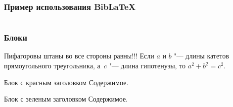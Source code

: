 \documentclass[aspectratio=169]{beamer}
\begin{document}
\begin{frame}
\frametitle{Пример использования BibLaTeX}
\medskip
\begin{columns}
\end{columns}
\end{frame}

\begin{frame}
\frametitle{Блоки}
	\begin{theorem}[Пифагора]
		Пифагоровы штаны во все стороны равны!!!
		Если $a$ и $b$ "--- длины катетов прямоугольного треугольника, а~$c$ "--- длина гипотенузы, то $a^2+b^2=c^2$.
	\end{theorem}

	\begin{alertblock}{Блок с красным заголовком}
		Содержимое.
	\end{alertblock}

	\begin{exampleblock}{Блок с зеленым заголовком}
		Содержимое.
	\end{exampleblock}
\end{frame}
\end{document}
